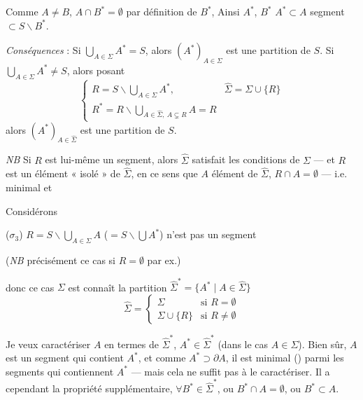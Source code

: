\documentclass[11pt,a4paper]{article}
\begin{document}
Comme $A\neq B$, $A\cap B^{*}=\emptyset$ par définition de $B^{*}$,
 Ainsi $A^{*}$, $B^{*}$ \ill{} $A^{*}\subset A$ segment
$\subset S\smallsetminus B^{*}$.


\emph{Conséquences} : Si $\bigcup_{A\in\Sigma}A^{*}=S$, alors
 $(A^{*})_{A\in\Sigma}$ est une partition 
 de $S$. Si $\bigcup_{A\in\Sigma}A^{*}\neq S$, alors
posant \struck{\ill{}}
\[
  \begin{cases}
    R=S\smallsetminus\bigcup_{A\in\Sigma}A^{*}, &
    \widehat{\Sigma}=\Sigma\cup\{R\}\\[2pt]
    R^{*}=R\smallsetminus\bigcup_{A\in\widehat{\Sigma},\ A\subsetneq R}A=R &
  \end{cases}
\]
alors $(A^{*})_{A\in\widehat{\Sigma}}$ est une partition
 de $S$.

\emph{NB} Si $R$ est lui-même un segment, alors \struck{\ill{}}
$\widehat{\Sigma}$ satisfait les conditions de $\Sigma$ — et $R$ est un
élément « isolé » de $\widehat{\Sigma}$, en ce sens que  $A$
\ill{} élément de $\widehat{\Sigma}$, \struck{\ill{}} $R\cap A=\emptyset$ —
i.e.\ \ill{} minimal et \ill{}

Considérons

($\sigma_{3}$) $R=S\smallsetminus\bigcup_{A\in\Sigma}A$
($=S\smallsetminus\bigcup A^{*}$) n'est pas un segment

(\emph{NB} précisément ce cas si $R=\emptyset$ par ex.)

 donc ce cas \struck{\ill{}} $\Sigma$ est \add{\ill{}}
 \ill{} connaît la partition
$\widehat{\Sigma}^{*}=\{A^{*}\mid A\in\widehat{\Sigma}\}$
\[
  \widehat{\Sigma}=
  \begin{cases}
    \Sigma & \text{si } R=\emptyset\\
    \Sigma\cup\{R\} & \text{si } R\neq\emptyset
  \end{cases}
\]

Je veux caractériser $A$ en termes de $\widehat{\Sigma}^{*}$,
$A^{*}\in\widehat{\Sigma}^{*}$ (dans le cas $A\in\Sigma$). Bien sûr, $A$ est
un segment qui contient $A^{*}$, et comme $A^{*}\supset\partial A$, il est
minimal (\ill{}) parmi les segments  qui contiennent $A^{*}$ — mais cela ne
suffit pas à le caractériser. Il a cependant la propriété supplémentaire,
$\forall B^{*}\in\widehat{\Sigma}^{*}$, ou $B^{*}\cap A=\emptyset$, ou
$B^{*}\subset A$.
\end{document}
